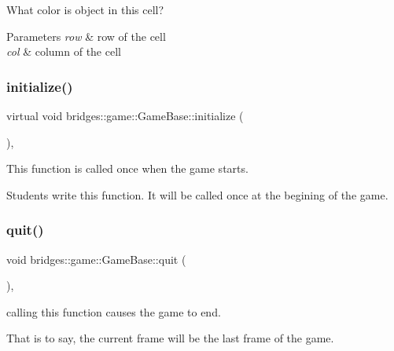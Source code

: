What color is object in this cell? 


\begin{DoxyParams}{Parameters}
{\em row} & row of the cell \\
\hline
{\em col} & column of the cell \\
\hline
\end{DoxyParams}
\mbox{\label{classbridges_1_1game_1_1_game_base_a9b6eb6fa7fceaac09d204b549164037f}} 
\subsubsection{\texorpdfstring{initialize()}{initialize()}}
{\footnotesize\ttfamily virtual void bridges\+::game\+::\+Game\+Base\+::initialize (\begin{DoxyParamCaption}{ }\end{DoxyParamCaption})\hspace{0.3cm}{\ttfamily [protected]}, {}}



This function is called once when the game starts. 

Students write this function. It will be called once at the begining of the game. \mbox{\label{classbridges_1_1game_1_1_game_base_a78d8bdc86cf7c5aba6a75879be1b6140}} 
\subsubsection{\texorpdfstring{quit()}{quit()}}
{\footnotesize\ttfamily void bridges\+::game\+::\+Game\+Base\+::quit (\begin{DoxyParamCaption}{ }\end{DoxyParamCaption})\hspace{0.3cm}{\ttfamily [inline]}, {\ttfamily [protected]}}



calling this function causes the game to end. 

That is to say, the current frame will be the last frame of the game. \mbox{\label{classbridges_1_1game_1_1_game_base_a9612e74fe407127cae8455a0e34b5662}} 
